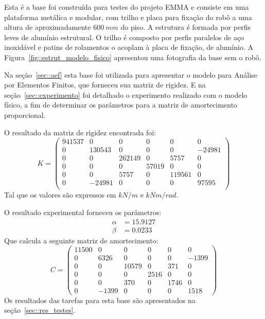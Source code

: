 Esta é a base foi construída para testes do projeto EMMA e consiste em uma
plataforma metálica e modular, com trilho e placa para fixação do robô a uma
altura de aproximadamente $600~mm$ do piso.
A estrutura é formada por perfis leves de alumínio estrutural. O trilho é
composto por perfis paralelos de aço inoxidável e patins de rolamentos o acoplam
à placa de fixação, de alumínio. A Figura~\ref{fig::estrut_modelo_fisico}
apresentou uma fotografia da base sem o robô.

Na seção~\ref{sec::aef} esta base foi utilizada para apresentar o modelo para
Análise por Elementos Finitos, que forneceu sua matriz de rigidez. E na
seção~\ref{sec::experimento} foi detalhado o experimento realizado com o modelo
físico, a fim de determinar os parâmetros para a matriz de amortecimento
proporcional.

O resultado da matriz de rigidez encontrada foi:
%
\begin{equation*}
	K =
\begin{pmatrix}
941537	&	0	&	0	&	0	&	0	&	0 \\
0	&	130543	&	0	&	0	&	0	&	-24981 \\
0	&	0	&	262149	&	0	&	5757	&	0 \\
0	&	0	&	0	&	57019	&	0	&	0 \\
0	&	0	&	5757	&	0	&	119561	&	0 \\
0	&	-24981	&	0	&	0	&	0	&	97595 \\
\end{pmatrix}
\end{equation*}
%
Tal que os valores são expressos em $kN/m$ e $kNm/rad$. 

O resultado experimental forneceu os parâmetros:
%
\begin{align*}
	\alpha &= 15.9127 \\
	\beta &= 0.0233
\end{align*} 
%
Que calcula a seguinte matriz de amortecimento:
%
\begin{equation*}
	C =
\begin{pmatrix}
11500	&	0		&	0		&	0		&	0		&	0		\\
0		&	6326	&	0		&	0		&	0		&	-1399	\\
0		&	0		&	10579	&	0		&	371	 	&	0		\\
0		&	0		&	0		&	2516 	&	0		&	0		\\
0		&	0		&	370		&	0		&	1746 	& 	0		\\
0		&	-1399	&	0		&	0		&	0		&	1518
\end{pmatrix}
\end{equation*}
%
Os resultados das tarefas para esta base são apresentados na
seção~\ref{sec::res_testes}.


